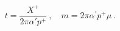 \begin{equation}
  \quad t = \frac{X^+}{2\pi\alpha' p^+}\ ,
  \quad {m}=2\pi\alpha^\prime p^+\mu\ .
\label{masstwo}
\end{equation}

